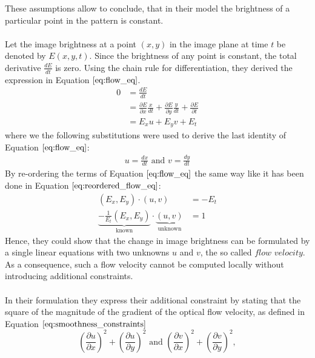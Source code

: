 These assumptions allow to conclude, that in their model the brightness of a particular point in the pattern is constant. \\ \\
Let the image brightness at a point $(x,y)$ in the image plane at time $t$ be denoted by $E(x,y,t)$. Since the brightness of any point is constant, the total derivative $\frac{d E}{dt}$ is zero. Using the chain rule for differentiation, they derived the expression in Equation $\ref{eq:flow_eq}$.  
\begin{equation}
\begin{aligned}
0 &= \frac{d E}{dt} \\
&= \frac{\partial E}{\partial x} \frac{x}{dt} + \frac{\partial E}{\partial y} \frac{y}{dt} + \frac{\partial E}{\partial t} \\
&= E_{x} u + E_{y} v + E_{t}
\end{aligned}
\label{eq:flow_eq}	
\end{equation}
where we the following substitutions were used to derive the last identity of Equation $\ref{eq:flow_eq}$:
\begin{equation}
\begin{aligned}
	u = \frac{dx}{dt} \text{ and } v = \frac{dy}{dt}
\end{aligned}
\end{equation}
By re-ordering the terms of Equation $\ref{eq:flow_eq}$ the same way like it has been done in Equation $\ref{eq:reordered_flow_eq}$:
\begin{equation}
\begin{aligned}
	(E_x, E_y) \cdot (u, v) &= -E_t \\
	\underbrace{-\frac{1}{E_t}\left( E_x, E_y \right)}_\text{known} \cdot \underbrace{(u, v)}_\text{unknown} &= 1
\end{aligned}
\label{eq:reordered_flow_eq}
\end{equation}
Hence, they could show that the change in image brightness can be formulated by a single linear equations with two unknowns $u$ and $v$, the so called $\textit{flow velocity}$. As a consequence, such a flow velocity cannot be computed locally without introducing additional constraints. \\ \\
In their formulation they express their additional constraint by stating that the square of the magnitude of the gradient of the optical flow velocity, as defined in Equation $\ref{eq:smoothness_constraints}$
\begin{equation}
	\left( \frac{\partial u}{\partial x} \right)^2 + \left( \frac{\partial u}{\partial y} \right)^2 \text{ and } \left( \frac{\partial v}{\partial x} \right)^2 + \left( \frac{\partial v}{\partial y} \right)^2,
\label{eq:smoothness_constraints}
\end{equation}
